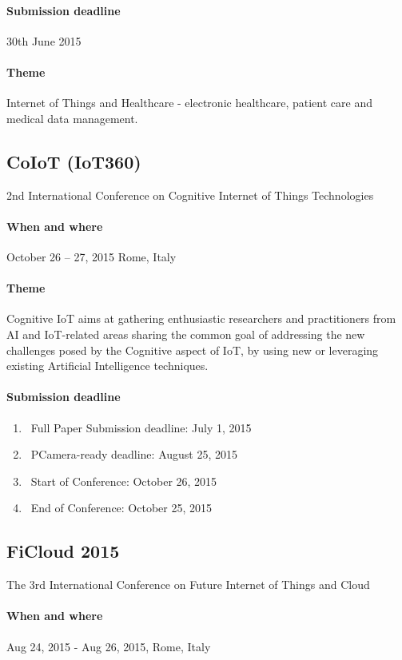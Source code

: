 \documentclass[12pt]{article}
\begin{document}
\paragraph {Submission deadline} 30th June 2015
\paragraph {Theme} Internet of Things and Healthcare - electronic healthcare, patient care and medical data management.

\subsection {CoIoT (IoT360)} 2nd International Conference on Cognitive Internet of Things Technologies
\paragraph {When and where}  October 26 – 27, 2015 Rome, Italy
\paragraph {Theme} Cognitive IoT aims at gathering enthusiastic researchers and practitioners from AI and IoT-related areas sharing the common goal of addressing the new challenges posed by the Cognitive aspect of IoT, by using new or leveraging existing Artificial Intelligence techniques.

\paragraph {Submission deadline}
\begin{enumerate}
\item\ Full Paper Submission deadline: July 1, 2015
\item\ PCamera-ready deadline: August 25, 2015
\item\ Start of Conference: October 26, 2015
\item\ End of Conference: October 25, 2015
\end{enumerate}

\subsection{FiCloud 2015 } The 3rd International Conference on Future Internet of Things and Cloud
\paragraph {When and where} Aug 24, 2015 - Aug 26, 2015, Rome, Italy
\end{document}
